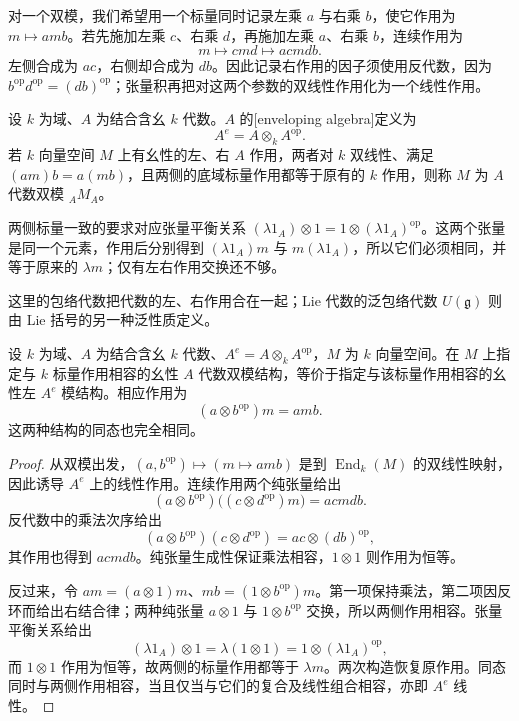 \ProseParagraphBreak
对一个双模，我们希望用一个标量同时记录左乘 \(a\) 与右乘 \(b\)，使它作用为 \(m\mapsto amb\)。若先施加左乘 \(c\)、右乘 \(d\)，再施加左乘 \(a\)、右乘 \(b\)，连续作用为
\[
	m\longmapsto cmd\longmapsto acmdb.
\]
左侧合成为 \(ac\)，右侧却合成为 \(db\)。因此记录右作用的因子须使用反代数，因为 \(b^{\mathrm{op}}d^{\mathrm{op}}=(db)^{\mathrm{op}}\)；张量积再把对这两个参数的双线性作用化为一个线性作用。

\begin{definition}\label{b2:def:enveloping-algebra}
	设 \(k\) 为域、\(A\) 为结合含幺 \(k\) 代数。\(A\) 的[enveloping algebra]定义为
	\[
		A^e=A\otimes_k A^{\mathrm{op}}.
	\]
	若 \(k\) 向量空间 \(M\) 上有幺性的左、右 \(A\) 作用，两者对 \(k\) 双线性、满足 \((am)b=a(mb)\)，且两侧的底域标量作用都等于原有的 \(k\) 作用，则称 \(M\) 为 \(A\) 代数双模 \({}_AM_A\)。
\end{definition}

两侧标量一致的要求对应张量平衡关系 \((\lambda1_A)\otimes1=1\otimes(\lambda1_A)^{\mathrm{op}}\)。这两个张量是同一个元素，作用后分别得到 \((\lambda1_A)m\) 与 \(m(\lambda1_A)\)，所以它们必须相同，并等于原来的 \(\lambda m\)；仅有左右作用交换还不够。

\ProseParagraphBreak
这里的包络代数把代数的左、右作用合在一起；Lie 代数的泛包络代数 \(U(\mathfrak g)\) 则由 Lie 括号的另一种泛性质定义。

\begin{theorem}\label{b2:thm:enveloping-bimodules}
	设 \(k\) 为域、\(A\) 为结合含幺 \(k\) 代数、\(A^e=A\otimes_kA^{\mathrm{op}}\)，\(M\) 为 \(k\) 向量空间。在 \(M\) 上指定与 \(k\) 标量作用相容的幺性 \(A\) 代数双模结构，等价于指定与该标量作用相容的幺性左 \(A^e\) 模结构。相应作用为
	\begin{equation}\label{b2:eq:enveloping-action}
		(a\otimes b^{\mathrm{op}})m=amb.
	\end{equation}
	这两种结构的同态也完全相同。
\end{theorem}
\begin{proof}
	从双模出发，\((a,b^{\mathrm{op}})\mapsto(m\mapsto amb)\) 是到 \(\operatorname{End}_k(M)\) 的双线性映射，因此诱导 \(A^e\) 上的线性作用。连续作用两个纯张量给出
	\[
		(a\otimes b^{\mathrm{op}})\bigl((c\otimes d^{\mathrm{op}})m\bigr) =acmdb.
	\]
	反代数中的乘法次序给出
	\[
		(a\otimes b^{\mathrm{op}})(c\otimes d^{\mathrm{op}}) =ac\otimes(db)^{\mathrm{op}},
	\]
	其作用也得到 \(acmdb\)。纯张量生成性保证乘法相容，\(1\otimes1\) 则作用为恒等。

	反过来，令 \(am=(a\otimes1)m\)、\(mb=(1\otimes b^{\mathrm{op}})m\)。第一项保持乘法，第二项因反环而给出右结合律；两种纯张量 \(a\otimes1\) 与 \(1\otimes b^{\mathrm{op}}\) 交换，所以两侧作用相容。张量平衡关系给出
	\[
		(\lambda1_A)\otimes1=\lambda(1\otimes1) =1\otimes(\lambda1_A)^{\mathrm{op}},
	\]
	而 \(1\otimes1\) 作用为恒等，故两侧的标量作用都等于 \(\lambda m\)。两次构造恢复原作用。同态同时与两侧作用相容，当且仅当与它们的复合及线性组合相容，亦即 \(A^e\) 线性。
\end{proof}

